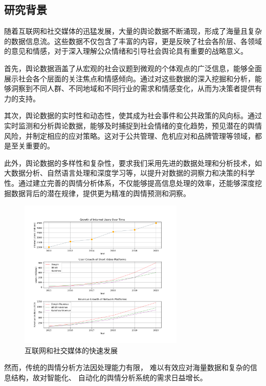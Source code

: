 \documentclass[UTF8,a4paper,15pt,titlepage,oneside]{ctexbook}
\begin{document}
\subsection{研究背景}

随着互联网和社交媒体的迅猛发展，大量的舆论数据不断涌现，形成了海量且复杂的数据信息流。这些数据不仅包含了丰富的内容，更是反映了社会各阶层、各领域的意见和情感，对于深入理解公众情绪和引导社会舆论具有重要的战略意义。

首先，舆论数据涵盖了从宏观的社会议题到微观的个体观点的广泛信息，能够全面展示社会各个层面的关注焦点和情感倾向。通过对这些数据的深入挖掘和分析，能够洞察到不同人群、不同地域和不同行业的需求和情感变化，从而为决策者提供有力的支持。

其次，舆论数据的实时性和动态性，使其成为社会事件和公共政策的风向标。通过实时监测和分析舆论数据，能够及时捕捉到社会情绪的变化趋势，预见潜在的舆情风险，并制定相应的应对策略。这对于公共管理、危机应对和品牌管理等领域，都是至关重要的。

此外，舆论数据的多样性和复杂性，要求我们采用先进的数据处理和分析技术，如大数据分析、自然语言处理和深度学习等，以提升对数据的洞察力和决策的科学性。通过建立完善的舆情分析体系，不仅能够提高信息处理的效率，还能够深度挖掘数据背后的潜在规律，提供更为精准的舆情预测和洞察。

\begin{figure}[H]
  \centering
  \includegraphics[width=0.7\textwidth,keepaspectratio=false]{pictures/10.png} %
  \caption{互联网和社交媒体的快速发展}
  
\end{figure}

然而，传统的舆情分析方法因处理能力有限，
难以有效应对海量数据和复杂的信息结构，故对智能化、
自动化的舆情分析系统的需求日益增长。
\end{document}
